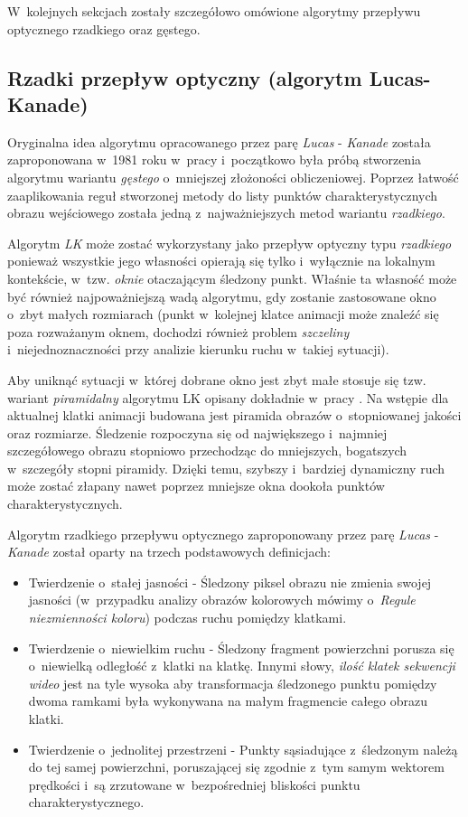     W~kolejnych sekcjach zostały szczegółowo omówione algorytmy przepływu optycznego rzadkiego oraz gęstego.

    \subsection{Rzadki przepływ optyczny (algorytm Lucas-Kanade)}
    Oryginalna idea algorytmu opracowanego przez parę \textit{Lucas} - \textit{Kanade} została zaproponowana w~1981 roku w~pracy \cite{LucasKanadeTracker81} i~początkowo była próbą stworzenia algorytmu wariantu \textit{gęstego} o~mniejszej złożoności obliczeniowej. Poprzez łatwość zaaplikowania reguł stworzonej metody do listy punktów charakterystycznych obrazu wejściowego została jedną z~najważniejszych metod wariantu \textit{rzadkiego}.

    Algorytm \textit{LK} może zostać wykorzystany jako przepływ optyczny typu \textit{rzadkiego} ponieważ wszystkie jego własności opierają się tylko i~wyłącznie na lokalnym kontekście, w~tzw. \textit{oknie} otaczającym śledzony punkt. Właśnie ta własność może być również najpoważniejszą wadą algorytmu, gdy zostanie zastosowane okno o~zbyt małych rozmiarach (punkt w~kolejnej klatce animacji może znaleźć się poza rozważanym oknem, dochodzi również problem \textit{szczeliny} i~niejednoznaczności przy analizie kierunku ruchu w~takiej sytuacji).

    Aby uniknąć sytuacji w~której dobrane okno jest zbyt małe stosuje się tzw. wariant \textit{piramidalny} algorytmu LK opisany dokładnie w~pracy \cite{OpenCvOpticalFlow04}. Na wstępie dla aktualnej klatki animacji budowana jest piramida obrazów o~stopniowanej jakości oraz rozmiarze. Śledzenie rozpoczyna się od największego i~najmniej szczegółowego obrazu stopniowo przechodząc do mniejszych, bogatszych w~szczegóły stopni piramidy. Dzięki temu, szybszy i~bardziej dynamiczny ruch może zostać złapany nawet poprzez mniejsze okna dookoła punktów charakterystycznych.

    Algorytm rzadkiego przepływu optycznego zaproponowany przez parę \textit{Lucas} - \textit{Kanade} został oparty na trzech podstawowych definicjach:
    \begin{itemize}
      \item Twierdzenie o~stałej jasności - Śledzony piksel obrazu nie zmienia swojej jasności (w~przypadku analizy obrazów kolorowych mówimy o~\textit{Regule niezmienności koloru}) podczas ruchu pomiędzy klatkami.
      \item Twierdzenie o~niewielkim ruchu - Śledzony fragment powierzchni porusza się o~niewielką odległość z~klatki na klatkę. Innymi słowy, \textit{ilość klatek sekwencji wideo} jest na tyle wysoka aby transformacja śledzonego punktu pomiędzy dwoma ramkami była wykonywana na małym fragmencie całego obrazu klatki.
      \item Twierdzenie o~jednolitej przestrzeni - Punkty sąsiadujące z~śledzonym należą do tej samej powierzchni, poruszającej się zgodnie z~tym samym wektorem prędkości i~są zrzutowane w~bezpośredniej bliskości punktu charakterystycznego.
    \end{itemize}

